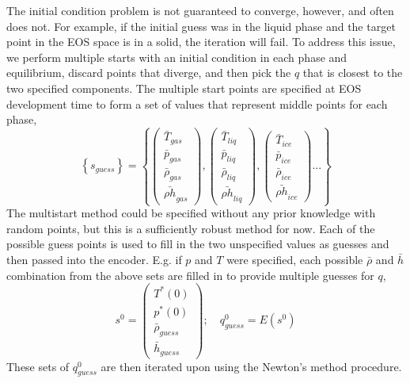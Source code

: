 \documentclass[AMA,STIX1COL]{WileyNJD-v2}
\begin{document}
The initial condition problem is not guaranteed to converge, however,
and often does not.
For example, if the initial guess was in the liquid phase and the target point
in the EOS space is in a solid, the iteration will fail.
To address this issue, we perform multiple starts with an initial condition in each
phase and equilibrium, discard points that diverge, and then pick the
\(q\) that is closest to the two specified components. The multiple
start points are specified at EOS development time to form a set of
values that represent middle points for each phase,
\begin{equation}
\left\{s_{guess}\right\} = \left\{ \left(\begin{array}{c}
\bar{T}_{gas}\\
\bar{p}_{gas}\\
\bar{\rho}_{gas}\\
\bar{\rho h}_{gas}
\end{array}\right),\left(\begin{array}{c}
\bar{T}_{liq}\\
\bar{p}_{liq}\\
\bar{\rho}_{liq}\\
\bar{\rho h}_{liq}
\end{array}\right),\left(\begin{array}{c}
\bar{T}_{ice}\\
\bar{p}_{ice}\\
\bar{\rho}_{ice}\\
\bar{\rho h}_{ice}
\end{array}\right)... \right\}
  \end{equation}
The multistart method could be specified without any prior knowledge
with random points, but this is a sufficiently robust method for
now. Each of the possible guess points is used to fill in the two
unspecified values as guesses and then passed into the encoder.
E.g. if $p$ and $T$ were specified, each possible $\bar{\rho}$ and
$\bar{h}$ combination from the above sets are filled in to provide
multiple guesses for $q$,
\begin{equation}
s^0 = \left(\begin{array}{c}
T^*(0)\\
p^*(0)\\
\bar{\rho}_{guess}\\
\bar{h}_{guess}
\end{array}\right);\quad q^0_{guess}=E\left(s^0\right)
 \end{equation}
 These sets of $q^0_{guess}$ are then iterated upon using the Newton's
 method procedure. 
\end{document}
